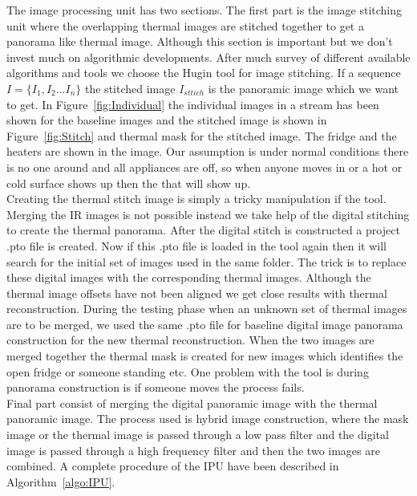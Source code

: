 \documentclass{sig-alternate}
\begin{document}
	The image processing unit has two sections. The first part is the image stitching unit where the overlapping thermal images are stitched together to get a panorama like thermal image. Although this section is important but we don't invest much on algorithmic developments. After much survey of different available algorithms and tools we choose the Hugin tool for image stitching. If a sequence $I = \{I_1, I_2 ... I_n\}$  the stitched image $I_{sttich}$ is the panoramic image which we want to get. In Figure~\ref{fig:Individual} the individual images in a stream has been shown for the baseline images and the stitched image is shown in Figure~\ref{fig:Stitch} and thermal mask for the stitched image. The fridge and the heaters are shown in the image. Our assumption is under normal conditions there is no one around and all appliances are off, so when anyone moves in or a hot or cold surface shows up then the that will show up.\\	
	\indent Creating the thermal stitch image is simply a tricky manipulation if the tool. Merging the IR images is not possible instead we take help of the digital stitching to create the thermal panorama. After the digital stitch is constructed a project .pto file is created. Now if this .pto file is loaded in the tool again then it will search for the initial set of images used in the same folder. The trick is to replace these digital images with the corresponding thermal images. Although the thermal image offsets have not been aligned we get close results with thermal reconstruction. During the testing phase when an unknown set of thermal images are to be merged, we used the same .pto file for baseline digital image panorama construction for the new thermal reconstruction. When the two images are merged together the thermal mask is created for new images which identifies the open fridge or someone standing etc. One problem with the tool is during panorama construction is if someone moves the process fails. \\
	\indent Final part consist of merging the digital panoramic image with the thermal panoramic image. The process used is hybrid image construction, where the mask image or the thermal image is passed through a low pass filter and the digital image is passed through a high frequency filter and then the two images are combined. A complete procedure of the IPU have been described in Algorithm~\ref{algo:IPU}.
\end{document}
